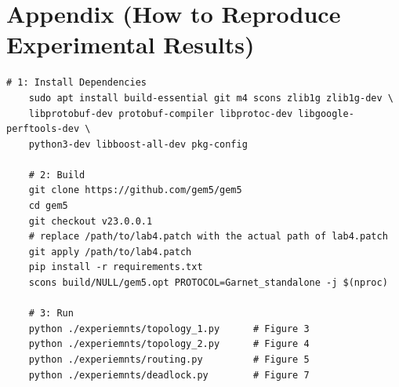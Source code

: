 \documentclass[utf8]{article}
\begin{document}
\section*{Appendix (How to Reproduce Experimental Results)}
\begin{Verbatim}[frame=single]
    # 1: Install Dependencies
    sudo apt install build-essential git m4 scons zlib1g zlib1g-dev \
    libprotobuf-dev protobuf-compiler libprotoc-dev libgoogle-perftools-dev \
    python3-dev libboost-all-dev pkg-config

    # 2: Build
    git clone https://github.com/gem5/gem5
    cd gem5
    git checkout v23.0.0.1
    # replace /path/to/lab4.patch with the actual path of lab4.patch
    git apply /path/to/lab4.patch
    pip install -r requirements.txt
    scons build/NULL/gem5.opt PROTOCOL=Garnet_standalone -j $(nproc)

    # 3: Run
    python ./experiemnts/topology_1.py      # Figure 3
    python ./experiemnts/topology_2.py      # Figure 4
    python ./experiemnts/routing.py         # Figure 5
    python ./experiemnts/deadlock.py        # Figure 7

\end{Verbatim}
\end{document}
